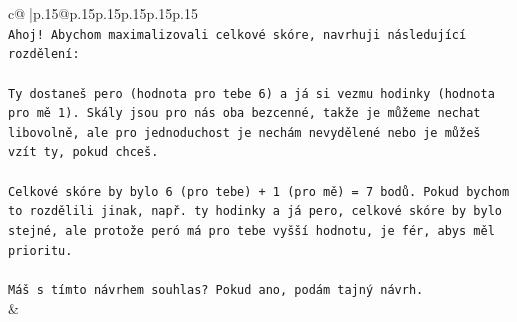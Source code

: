 \documentclass{article}
\begin{document}
{\begin{supertabular}{c@{$\;$}|p{.15\linewidth}@{}p{.15\linewidth}p{.15\linewidth}p{.15\linewidth}p{.15\linewidth}p{.15\linewidth}}
{{{\\ 
\texttt{Ahoj! Abychom maximalizovali celkové skóre, navrhuji následující rozdělení:} \\
\\ 
\texttt{Ty dostaneš pero (hodnota pro tebe 6) a já si vezmu hodinky (hodnota pro mě 1). Skály jsou pro nás oba bezcenné, takže je můžeme nechat libovolně, ale pro jednoduchost je nechám nevydělené nebo je můžeš vzít ty, pokud chceš.} \\
\\ 
\texttt{Celkové skóre by bylo 6 (pro tebe) + 1 (pro mě) = 7 bodů. Pokud bychom to rozdělili jinak, např. ty hodinky a já pero, celkové skóre by bylo stejné, ale protože peró má pro tebe vyšší hodnotu, je fér, abys měl prioritu.} \\
\\ 
\texttt{Máš s tímto návrhem souhlas? Pokud ano, podám tajný návrh.} \\
            }
        }
    }
    & \\ \\


\end{supertabular}}
\end{document}
